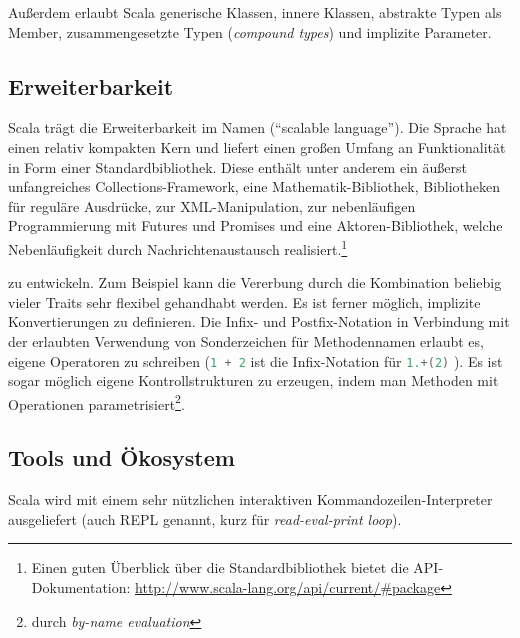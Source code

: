 \documentclass[a4paper, 12pt, hidelinks, listof=totoc, listoftables=totoc, bibliography=totoc]{scrreprt}
\newcommand{\scala}[1]{\lstinline[language=Scala, style=inline]|#1|}
\begin{document}
Außerdem erlaubt Scala generische Klassen, innere Klassen, abstrakte Typen als Member, zusammengesetzte Typen (\textit{compound types}) und implizite Parameter.\cite[S. 16 ff., S. 205 ff.]{odersky2008.PIS}\cite[S. 113 ff.]{piepmeyer2010.GFP}\cite{scala-lang2011.CSS}

\subsection{Erweiterbarkeit}

Scala trägt die Erweiterbarkeit im Namen ("`scalable language"').
Die Sprache hat einen relativ kompakten Kern und liefert einen großen Umfang an Funktionalität in Form einer Standardbibliothek. Diese enthält unter anderem ein äußerst unfangreiches Collections-Framework, eine Mathematik-Bibliothek, Bibliotheken für reguläre Ausdrücke, zur XML-Manipulation, zur nebenläufigen Programmierung mit Futures und Promises und eine Aktoren-Bibliothek, welche Nebenläufigkeit durch Nachrichtenaustausch realisiert.\footnote{Einen guten Überblick über die Standardbibliothek bietet die API-Dokumentation: \url{http://www.scala-lang.org/api/current/\#package}}


zu entwickeln. Zum Beispiel kann die Vererbung durch die Kombination beliebig vieler Traits sehr flexibel gehandhabt werden. Es ist ferner möglich, implizite Konvertierungen zu definieren. Die Infix- und Postfix-Notation in Verbindung mit der erlaubten Verwendung von Sonderzeichen für Methodennamen erlaubt es, eigene Operatoren zu schreiben (\scala{1 + 2} ist die Infix-Notation für \scala{1.+(2)} ). Es ist sogar möglich eigene Kontrollstrukturen zu erzeugen, indem man Methoden mit Operationen parametrisiert\footnote{durch \textit{by-name evaluation}}.\cite[S. 4 ff.]{odersky2008.PIS}

\subsection{Tools und Ökosystem}

Scala wird mit einem sehr nützlichen interaktiven Kommandozeilen-Interpreter ausgeliefert (auch REPL genannt, kurz für \textit{read-eval-print loop}).
\end{document}
